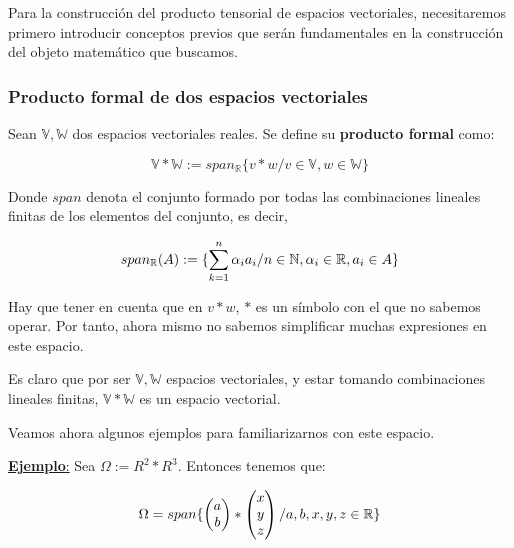 Para la construcción del producto tensorial de espacios vectoriales, necesitaremos primero introducir conceptos previos que serán fundamentales en la construcción del objeto matemático que buscamos.

\subsubsection{Producto formal de dos espacios vectoriales}

\begin{definicion}
    Sean $\mathbb{V}, \mathbb{W}$ dos espacios vectoriales reales. Se define su \textbf{producto formal} como:

    \begin{equation}
        \mathbb{V} \ast \mathbb{W} := span_{\mathbb{R}} \{v \ast w / v \in \mathbb{V}, w \in \mathbb{W} \}
    \end{equation}

    Donde $span$ denota el conjunto formado por todas las combinaciones lineales finitas de los elementos del conjunto, es decir,

    \begin{equation}
        span_{\mathbb{R}}(A) := \{ \sum_{k = 1}^n \alpha_i a_i / n \in \mathbb{N}, \alpha_i \in \mathbb{R}, a_i \in A \}
    \end{equation}

    Hay que tener en cuenta que en $v \ast w$, $\ast$ es un símbolo con el que no sabemos operar. Por tanto, ahora mismo no sabemos simplificar muchas expresiones en este espacio.
\end{definicion}

Es claro que por ser $\mathbb{V}, \mathbb{W}$ espacios vectoriales, y estar tomando combinaciones lineales finitas, $\mathbb{V} \ast \mathbb{W}$ es un espacio vectorial.

Veamos ahora algunos ejemplos para familiarizarnos con este espacio.

\underline{\textbf{Ejemplo}:} Sea $\Omega := R^2 \ast R^3$. Entonces tenemos que:

\begin{equation}
    \Omega = span \{
        \begin{pmatrix}
            a \\
            b
        \end{pmatrix}
        \ast
        \begin{pmatrix}
            x \\
            y \\
            z
        \end{pmatrix}
        / a, b, x, y, z \in \mathbb{R}
    \}
\end{equation}

